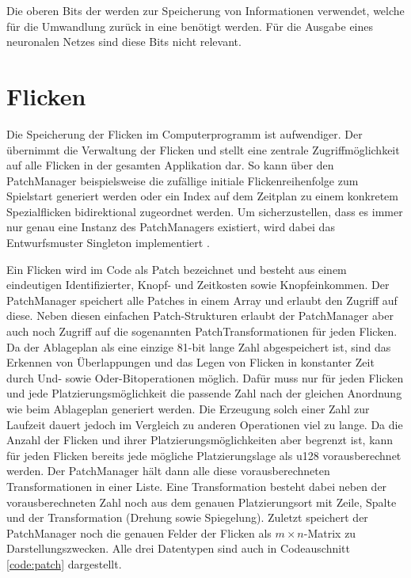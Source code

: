 Die oberen Bits der \hyperref[text:natural-action-id]{} werden zur Speicherung von Informationen verwendet, welche für die Umwandlung zurück in eine \hyperref[text:action-id]{} benötigt werden. Für die Ausgabe eines neuronalen Netzes sind diese Bits nicht relevant.

\section{Flicken}

Die Speicherung der Flicken im Computerprogramm ist aufwendiger. Der  übernimmt die Verwaltung der Flicken und stellt eine zentrale Zugriffmöglichkeit auf alle Flicken in der gesamten Applikation dar. So kann über den PatchManager beispielsweise die zufällige initiale Flickenreihenfolge zum Spielstart generiert werden oder ein Index auf dem Zeitplan zu einem konkretem Spezialflicken bidirektional zugeordnet werden. Um sicherzustellen, dass es immer nur genau eine Instanz des PatchManagers existiert, wird dabei das Entwurfsmuster Singleton implementiert \cite[S. 127]{2000.Gamma}.


\vspace*{-1cm}

Ein Flicken wird im Code als Patch bezeichnet und besteht aus einem eindeutigen Identifizierter, Knopf- und Zeitkosten sowie Knopfeinkommen. Der PatchManager speichert alle Patches in einem Array und erlaubt den Zugriff auf diese. Neben diesen einfachen Patch-Strukturen erlaubt der PatchManager aber auch noch Zugriff auf die sogenannten PatchTransformationen für jeden Flicken. Da der Ablageplan als eine einzige 81-bit lange Zahl abgespeichert ist, sind das Erkennen von Überlappungen und das Legen von Flicken in konstanter Zeit durch Und- sowie Oder-Bitoperationen möglich. Dafür muss nur für jeden Flicken und jede Platzierungsmöglichkeit die passende Zahl nach der gleichen Anordnung wie beim Ablageplan generiert werden. Die Erzeugung solch einer Zahl zur Laufzeit dauert jedoch im Vergleich zu anderen Operationen viel zu lange. Da die Anzahl der Flicken und ihrer Platzierungsmöglichkeiten aber begrenzt ist, kann für jeden Flicken bereits jede mögliche Platzierungslage als \ac{u128} vorausberechnet werden. Der PatchManager hält dann alle diese vorausberechneten Transformationen in einer Liste. Eine Transformation besteht dabei neben der vorausberechneten Zahl noch aus dem genauen Platzierungsort mit Zeile, Spalte und der Transformation (Drehung sowie Spiegelung). Zuletzt speichert der PatchManager noch die genauen Felder der Flicken als $m\times n$-Matrix zu Darstellungszwecken. Alle drei Datentypen sind auch in Codeauschnitt \ref{code:patch} dargestellt.

